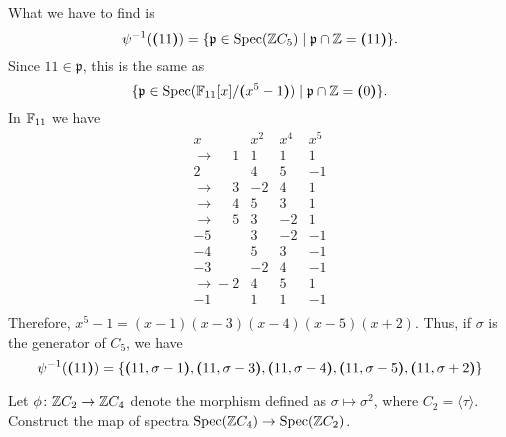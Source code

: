 \begin{solution}
    What we have to find is
    $$
        \psi^{-1}(\textrm{\boldmath$($}11\textrm{\boldmath$)$})=\{\mathfrak p\in\operatorname{Spec}(\mathbb{Z} C_5)
            \mid \mathfrak p\cap\mathbb{Z}=\textrm{\boldmath$($}11\textrm{\boldmath$)$}\}.
    $$
    Since $11\in\mathfrak p$, this is the same as
    $$
        \{\mathfrak p\in\operatorname{Spec}(\mathbb{F}_{11}[x]/\textrm{\boldmath$($}x^5-1\textrm{\boldmath$)$})
            \mid \mathfrak p\cap\mathbb{Z}=\textrm{\boldmath$($}0\textrm{\boldmath$)$}\}.
    $$
    In $\mathbb{F}_{11}$ we have
    \small
    $$
    \begin{array}{r|rrr}
        x & x^2 & x^4 & x^5 \\
        \hline
        \to\phantom-1  & 1  & 1  & 1  \\
        2  & 4  & 5  & -1 \\
        \to\phantom-3  & -2 & 4  & 1  \\
        \to\phantom-4  & 5  & 3  & 1  \\
        \to\phantom-5  & 3  & -2 & 1  \\
        -5 & 3  & -2 & -1 \\
        -4 & 5  & 3  & -1 \\
        -3 & -2 & 4  & -1 \\
        \to\phantom{}-2 & 4  & 5  & 1  \\
        -1 & 1  & 1  & -1 \\
    \end{array}
    $$
    \normalsize
    Therefore, $x^5-1=(x-1)(x-3)(x-4)(x-5)(x+2)$. Thus, if $\sigma$ is the generator of $C_5$, we have
    $$
        \psi^{-1}(\textrm{\boldmath$($}11\textrm{\boldmath$)$})=\{\textrm{\boldmath$($}11,\sigma-1\textrm{\boldmath$)$},
        \textrm{\boldmath$($}11,\sigma-3\textrm{\boldmath$)$},
        \textrm{\boldmath$($}11,\sigma-4\textrm{\boldmath$)$},
        \textrm{\boldmath$($}11,\sigma-5\textrm{\boldmath$)$},
        \textrm{\boldmath$($}11,\sigma+2\textrm{\boldmath$)$}\}
    $$
\end{solution}

\begin{exr}\label{exr:spec-prod-lemma}
    Let\/ $\phi\colon\mathbb{Z} C_2\to\mathbb{Z} C_4$ denote the morphism defined as\/ $\sigma\mapsto\sigma^2$, where $C_2=\langle\tau\rangle$. Construct the map of spectra\/ $\operatorname{Spec}(\mathbb{Z} C_4)\to\operatorname{Spec}(\mathbb{Z} C_2)$.
\end{exr}

